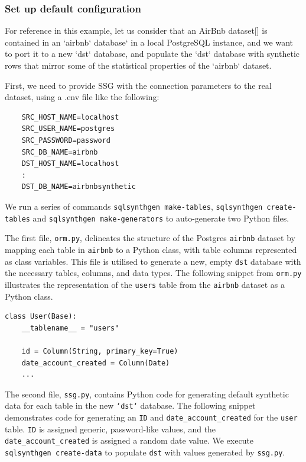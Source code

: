 \documentclass[11pt]{article}
\begin{document}
\subsubsection{Set up default configuration}

For reference in this example, let us consider that an AirBnb dataset[] is contained in an `airbnb` database` in a local PostgreSQL instance, and we want to port it to a new `dst` database, and populate the `dst` database with synthetic rows that mirror some of the statistical properties of the `airbnb` dataset.

First, we need to provide SSG with the connection parameters to the real dataset, using a .env file like the following:

\begin{verbatim}
    SRC_HOST_NAME=localhost 
    SRC_USER_NAME=postgres 
    SRC_PASSWORD=password
    SRC_DB_NAME=airbnb 
    DST_HOST_NAME=localhost 
    :
    DST_DB_NAME=airbnbsynthetic
\end{verbatim}

We run a series of commands \texttt{sqlsynthgen make-tables}, \texttt{sqlsynthgen create-tables} and \texttt{sqlsynthgen make-generators} to auto-generate two Python files. 

The first file, \texttt{orm.py}, delineates the structure of the Postgres \texttt{airbnb} dataset by mapping each table in \texttt{airbnb} to a Python class, with table columns represented as class variables. This file is utilised to generate a new, empty \texttt{dst} database with the necessary tables, columns, and data types. The following snippet from \texttt{orm.py} illustrates the representation of the \texttt{users} table from the \texttt{airbnb}  dataset as a Python class.

\begin{verbatim}
class User(Base):
    __tablename__ = "users"

    id = Column(String, primary_key=True)
    date_account_created = Column(Date)
    ...
\end{verbatim}

The second file, \texttt{ssg.py}, contains Python code for generating default synthetic data for each table in the new \texttt{`dst`} database. The following snippet demonstrates code for generating an \texttt{ID} and \texttt{date\_account\_created} for the \texttt{user} table. \texttt{ID} is assigned generic, password-like values, and the \texttt{date\_account\_created} is assigned a random date value. We execute \texttt{sqlsynthgen create-data} to populate \texttt{dst} with values generated by \texttt{ssg.py}.
\end{document}
